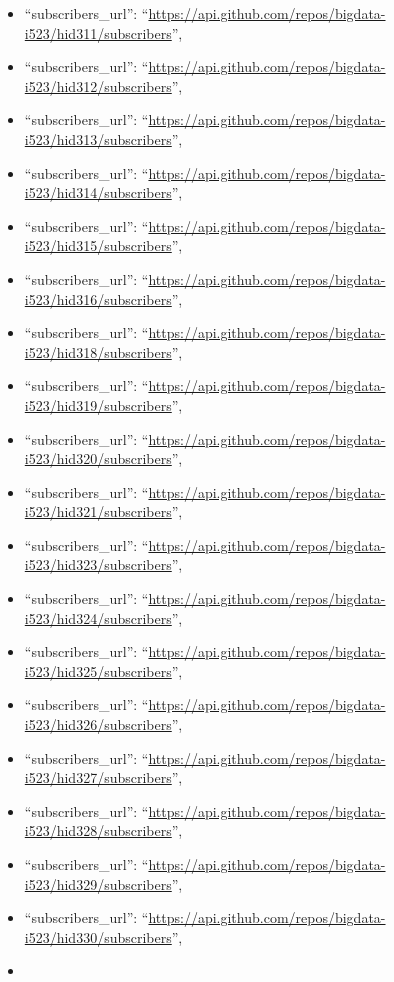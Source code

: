 \begin{itemize}
\item
  ``subscribers\_url'':
  ``\url{https://api.github.com/repos/bigdata-i523/hid311/subscribers}'',
\item
  ``subscribers\_url'':
  ``\url{https://api.github.com/repos/bigdata-i523/hid312/subscribers}'',
\item
  ``subscribers\_url'':
  ``\url{https://api.github.com/repos/bigdata-i523/hid313/subscribers}'',
\item
  ``subscribers\_url'':
  ``\url{https://api.github.com/repos/bigdata-i523/hid314/subscribers}'',
\item
  ``subscribers\_url'':
  ``\url{https://api.github.com/repos/bigdata-i523/hid315/subscribers}'',
\item
  ``subscribers\_url'':
  ``\url{https://api.github.com/repos/bigdata-i523/hid316/subscribers}'',
\item
  ``subscribers\_url'':
  ``\url{https://api.github.com/repos/bigdata-i523/hid318/subscribers}'',
\item
  ``subscribers\_url'':
  ``\url{https://api.github.com/repos/bigdata-i523/hid319/subscribers}'',
\item
  ``subscribers\_url'':
  ``\url{https://api.github.com/repos/bigdata-i523/hid320/subscribers}'',
\item
  ``subscribers\_url'':
  ``\url{https://api.github.com/repos/bigdata-i523/hid321/subscribers}'',
\item
  ``subscribers\_url'':
  ``\url{https://api.github.com/repos/bigdata-i523/hid323/subscribers}'',
\item
  ``subscribers\_url'':
  ``\url{https://api.github.com/repos/bigdata-i523/hid324/subscribers}'',
\item
  ``subscribers\_url'':
  ``\url{https://api.github.com/repos/bigdata-i523/hid325/subscribers}'',
\item
  ``subscribers\_url'':
  ``\url{https://api.github.com/repos/bigdata-i523/hid326/subscribers}'',
\item
  ``subscribers\_url'':
  ``\url{https://api.github.com/repos/bigdata-i523/hid327/subscribers}'',
\item
  ``subscribers\_url'':
  ``\url{https://api.github.com/repos/bigdata-i523/hid328/subscribers}'',
\item
  ``subscribers\_url'':
  ``\url{https://api.github.com/repos/bigdata-i523/hid329/subscribers}'',
\item
  ``subscribers\_url'':
  ``\url{https://api.github.com/repos/bigdata-i523/hid330/subscribers}'',
\item

\end{itemize}
